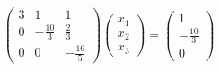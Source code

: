 \documentclass[preview]{standalone}
\begin{document}
\begin{align*}
\begin{pmatrix}3 & 1 & 1 \\0 & -\frac{10}{3} & \frac{2}{3} \\0 & 0 & -\frac{16}{5}\end{pmatrix}\begin{pmatrix} x_1 \\ x_2 \\ x_3 \end{pmatrix}= \begin{pmatrix} 1 \\ -\frac{10}{3} \\ 0 \end{pmatrix}
\end{align*}
\end{document}
